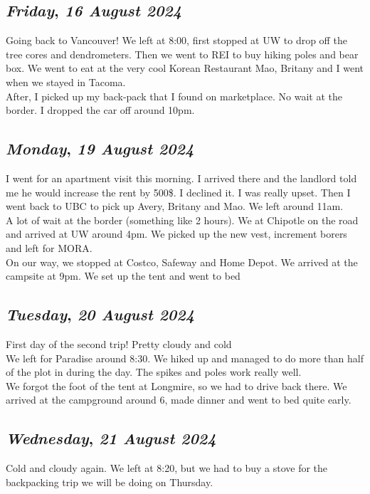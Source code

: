 \def\day{\textit{16 August 2024}}
\def\weekday{\textit{Friday}}
\subsection*{\weekday, \day}
Going back to Vancouver! We left at 8:00, first stopped at UW to drop off the tree cores and dendrometers. Then we went to REI to buy hiking poles and bear box. We went to eat at the very cool Korean Restaurant Mao, Britany and I went when we stayed in Tacoma. \\
After, I picked up my back-pack that I found on marketplace. No wait at the border. I dropped the car off around 10pm. 

\def\day{\textit{19 August 2024}}
\def\weekday{\textit{Monday}}
\subsection*{\weekday, \day}
I went for an apartment visit this morning. I arrived there and the landlord told me he would increase the rent by 500\$. I declined it. I was really upset. Then I went back to UBC to pick up Avery, Britany and Mao. We left around 11am. \\
A lot of wait at the border (something like 2 hours). We at Chipotle on the road and arrived at UW around 4pm. We picked up the new vest, increment borers and left for MORA. \\ 
On our way, we stopped at Costco, Safeway and Home Depot. 
We arrived at the campsite at 9pm. We set up the tent and went to bed

\def\day{\textit{20 August 2024}}
\def\weekday{\textit{Tuesday}}
\subsection*{\weekday, \day}
First day of the second trip! Pretty cloudy and cold\\
We left for Paradise around 8:30. We hiked up and managed to do more than half of the plot in during the day. The spikes and poles work really well.\\
We forgot the foot of the tent at Longmire, so we had to drive back there. We arrived at the campground around 6, made dinner and went to bed quite early.

\def\day{\textit{21 August 2024}}
\def\weekday{\textit{Wednesday}}
\subsection*{\weekday, \day}
Cold and cloudy again. We left at 8:20, but we had to buy a stove for the backpacking trip we will be doing on Thursday. 
\def\day{\textit{22 August 2024}}
\def\weekday{\textit{Thursday}}
